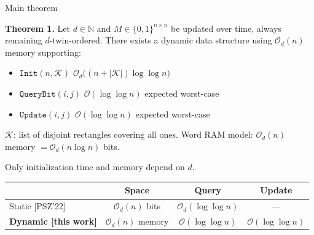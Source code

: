 \documentclass[aspectratio=169,11pt]{beamer}
\newcommand{\Oh}{\mathcal{O}}
\begin{document}
\begin{frame}{Main theorem}
\begin{block}{\textbf{Theorem 1.}}
Let $d\in\mathbb{N}$ and $M\in\{0,1\}^{n\times n}$ be updated over time, always remaining $d$-twin-ordered.
There exists a dynamic data structure using $\Oh_d(n)$ memory supporting:
\begin{itemize}
\item $\mathtt{Init}(n,\mathcal{K})$ \hfill $\Oh_d\!\bigl((n+|\mathcal{K}|)\log\log n\bigr)$
\item $\mathtt{QueryBit}(i,j)$ \hfill $\Oh(\log\log n)$ expected worst-case
\item $\mathtt{Update}(i,j)$ \hfill $\Oh(\log\log n)$ expected worst-case
\end{itemize}
\end{block}

\smallskip
{\small $\mathcal{K}$: list of disjoint rectangles covering all ones. \quad Word RAM model: $\Oh_d(n)$ memory $=\Oh_d(n\log n)$ bits.}

\medskip
{\small Only initialization time and memory depend on $d$.}

\bigskip
\centering
\begin{tabular}{lccc}
\toprule
& \textbf{Space} & \textbf{Query} & \textbf{Update}\\
\midrule
Static [PSZ'22] & $\Oh_d(n)$ bits & $\Oh_d(\log\log n)$ & ---\\
\textbf{Dynamic [this work]} & $\Oh_d(n)$ memory & $\Oh(\log\log n)$ & $\Oh(\log\log n)$\\
\bottomrule
\end{tabular}
\end{frame}
\end{document}
